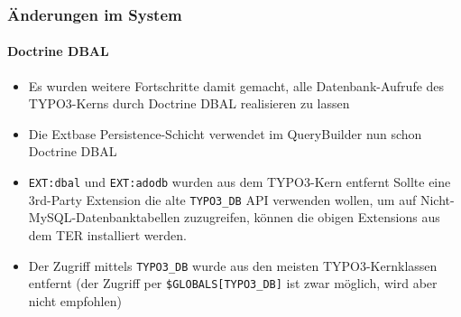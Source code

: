 
\begin{frame}[fragile]
	\frametitle{Änderungen im System}
	\framesubtitle{Doctrine DBAL}

	\begin{itemize}
		\item Es wurden weitere Fortschritte damit gemacht, alle Datenbank-Aufrufe des TYPO3-Kerns durch Doctrine DBAL realisieren zu lassen
		\item Die Extbase Persistence-Schicht verwendet im QueryBuilder nun schon  Doctrine DBAL
		\item \texttt{EXT:dbal} und \texttt{EXT:adodb} wurden aus dem TYPO3-Kern entfernt\newline
			\smaller
				Sollte eine 3rd-Party Extension die alte \texttt{TYPO3\_DB} API verwenden wollen, um auf Nicht-MySQL-Datenbanktabellen zuzugreifen, können die obigen Extensions aus dem TER installiert werden.
			\normalsize

		\item Der Zugriff mittels \texttt{TYPO3\_DB} wurde aus den meisten TYPO3-Kernklassen entfernt\newline
			\smaller
				(der Zugriff per \texttt{\$GLOBALS[TYPO3\_DB]} ist zwar möglich, wird aber nicht empfohlen)
			\normalsize

	\end{itemize}

\end{frame}


